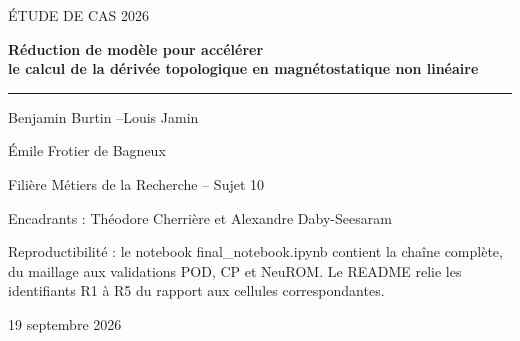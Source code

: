 \documentclass[10pt,a4paper]{article}
\begin{document}

\begin{titlepage}
\thispagestyle{empty}
\begin{center}
\vspace*{1.4cm}
{\color{teal}\large ÉTUDE DE CAS 2026}\par\vspace{.9cm}
{\color{navy}\Huge\bfseries Réduction de modèle pour accélérer\\[.12em]le calcul de la dérivée topologique en magnétostatique non linéaire}\par
\vspace{1.2cm}\hrule\vspace{.85cm}
{\large Benjamin Burtin \quad--\quad Louis Jamin}\par\vspace{.25cm}
{\large Émile Frotier de Bagneux}\par
\vspace{.9cm}
{\large Filière Métiers de la Recherche -- Sujet 10}\par\vspace{.15cm}
{\color{muted}Encadrants : Théodore Cherrière et Alexandre Daby-Seesaram}\par
\vfill
\begin{minipage}{.86\linewidth}
\small\color{muted}
Reproductibilité : le notebook final\_notebook.ipynb contient la chaîne complète, du maillage aux validations POD, CP et NeuROM. Le README relie les identifiants R1 à R5 du rapport aux cellules correspondantes.
\end{minipage}
\vfill
{\color{muted}19 septembre 2026}
\end{center}
\end{titlepage}
\setcounter{page}{2}
\end{document}
